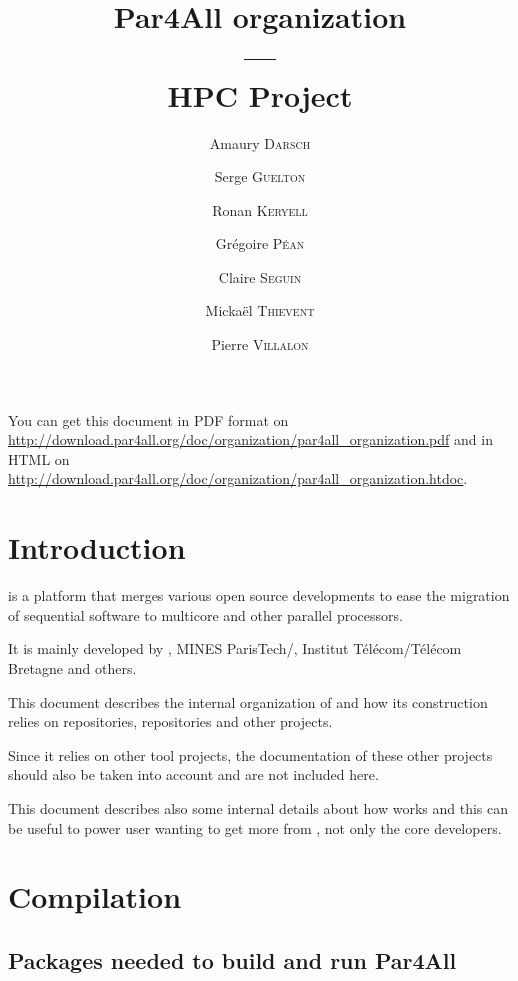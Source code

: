 \documentclass[a4paper]{article}
\newcommand{\LINK}[1]{\url{#1}\xspace}
\newcommand{\PfaOrganizationPDF}{\LINK{http://download.par4all.org/doc/organization/par4all_organization.pdf}}
\newcommand{\PfaAllOrganizationHTDOC}{\LINK{http://download.par4all.org/doc/organization/par4all_organization.htdoc}}
\begin{document}
\title{Par4All organization\\
  ---\\
  HPC Project}

\author{Amaury \textsc{Darsch} \and Serge \textsc{Guelton} \and Ronan
  \textsc{Keryell} \and Grégoire \textsc{Péan} \and Claire \textsc{Seguin}
  \and Mickaël \textsc{Thievent} \and Pierre \textsc{Villalon}}

\maketitle

You can get this document in PDF format on \PfaOrganizationPDF and in HTML
on \PfaAllOrganizationHTDOC.


\section{Introduction}
\label{sec:introduction}

\Apfa is a platform that merges various open source developments to ease
the migration of sequential software to multicore and other parallel
processors.

It is mainly developed by \Ahpcp, MINES ParisTech/\Acri, Institut
Télécom/Télécom Bretagne and others.

This document describes the internal organization of \Apfa and how its
construction relies on \Agit repositories, \Asvn repositories and other
projects.

Since it relies on other tool projects, the documentation of these other
projects should also be taken into account and are not included here.

This document describes also some internal details about how \Apfa works
and this can be useful to power user wanting to get more from \Apfa, not
only the \Apfa core developers.


\tableofcontents{}

\bigskip{}




\section{Compilation}
\label{sec:compilation}

\subsection{Packages needed to build and run Par4All}
\label{sec:pack-need-build}
\end{document}

